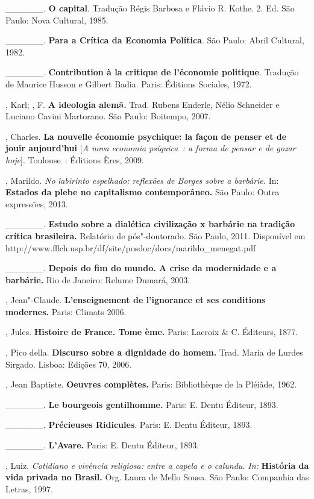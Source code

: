 \begin{Parskip}
\_\_\_\_\_\_. \textbf{O capital}. Tradução Régis Barbosa e Flávio R.
Kothe. 2. Ed. São Paulo: Nova Cultural, 1985.

\_\_\_\_\_\_. \textbf{Para a Crítica da Economia Política}. São Paulo:
Abril Cultural, 1982.

\_\_\_\_\_\_. \textbf{Contribution à la critique de l'économie
politique}. Tradução de Maurice Husson e Gilbert Badia. Paris: Éditions
Sociales, 1972.

, Karl; , F. \textbf{A ideologia alemã.} Trad. Rubens Enderle,
Nélio Schneider e Luciano Cavini Martorano. São Paulo: Boitempo, 2007.

, Charles. \textbf{La nouvelle économie psychique: la façon de
penser et de jouir aujourd'hui} [\emph{A nova economia psíquica~: a
forma de pensar e de gozar hoje}]. Toulouse~: Éditions Ères, 2009.

, Marildo. \emph{No labirinto espelhado: reflexões de Borges
sobre a barbárie.} In: \textbf{Estados da plebe no capitalismo
contemporâneo.} São Paulo: Outra expressões, 2013.

\_\_\_\_\_\_. \textbf{Estudo sobre a dialética civilização x barbárie na
tradição crítica brasileira.} Relatório de pós"-doutorado. São Paulo,
2011. Disponível em
http://www.fflch.usp.br/df/site/posdoc/docs/marildo\_menegat.pdf

\_\_\_\_\_\_. \textbf{Depois do fim do mundo. A crise da modernidade e a
barbárie.} Rio de Janeiro: Relume Dumará, 2003.

, Jean"-Claude. \textbf{L'enseignement de l'ignorance et ses
conditions modernes.} Paris: Climats 2006.

, Jules. \textbf{Histoire de France. Tome ème.} Paris: Lacroix
\& C. Éditeurs, 1877.

, Pico della. \textbf{Discurso sobre a dignidade do homem.}
Trad. Maria de Lurdes Sirgado. Lisboa: Edições 70, 2006.

, Jean Baptiste. \textbf{Oeuvres complètes.} Paris: Bibliothèque
de la Pléiâde, 1962.

\_\_\_\_\_\_. \textbf{Le bourgeois gentilhomme.} Paris: E. Dentu
Éditeur, 1893.

\_\_\_\_\_\_. \textbf{Précieuses Ridicules}. Paris: E. Dentu Éditeur,
1893.

\_\_\_\_\_\_. \textbf{L'Avare.} Paris: E. Dentu Éditeur, 1893.

, Luiz. \emph{Cotidiano e vivência religiosa: entre a capela e o
calundu.} \emph{In:} \textbf{História da vida privada no Brasil.} Org.
Laura de Mello Sousa. São Paulo: Companhia das Letras, 1997.


\end{Parskip}
